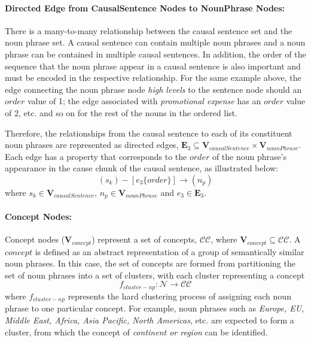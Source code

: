 \paragraph{Directed Edge from CausalSentence Nodes to NounPhrase Nodes:} There is a many-to-many relationship between the causal sentence set and the noun phrase set. A causal sentence can contain multiple noun phrases and a noun phrase can be contained in multiple causal sentences. In addition, the order of the sequence that the noun phrase appear in a causal sentence is also important and must be encoded in the respective relationship. For the same example above, the edge connecting the noun phrase node \emph{high levels} to the sentence node should an $order$ value of 1; the edge associated with \emph{promotional expense} has an $order$ value of 2, etc. and so on for the rest of the nouns in the ordered list. 

Therefore, the relationships from the causal sentence to each of its constituent noun phrases are represented as directed edges, $\mathbf{E}_3 \subseteq \mathbf{V}_{causalSentence} \times \mathbf{V}_{nounPhrase}$. Each edge has a property that corresponds to the $order$ of the noun phrase's appearance in the cause chunk of the causal sentence, as illustrated below:
\[( s_k ) - [ e_3 \{order\} ]\rightarrow ( n_p ) \] 
where $s_k \in \mathbf{V}_{causalSentence}$, $n_p \in \mathbf{V}_{nounPhrase}$ and $e_3 \in \mathbf{E}_3$.


\paragraph{Concept Nodes:} Concept nodes ($\mathbf{V}_{concept}$) represent a set of concepts, $\mathbf{\mathcal{CC}}$, where $\mathbf{V}_{concept} \subseteq \mathcal{CC}$. A $concept$ is defined as an abstract representation of a group of semantically similar noun phrases. In this case, the set of concepts are formed from partitioning the set of noun phrases into a set of clusters, with each cluster representing a concept
\[f_{cluster-np}: \mathbf{\mathcal{N}} \rightarrow \mathbf{\mathcal{CC}}\] 
where $f_{cluster-np}$ represents the hard clustering process of assigning each noun phrase to one particular concept. For example, noun phrases such as \emph{Europe, EU, Middle East, Africa, Asia Pacific, North Americas}, etc. are expected to form a cluster, from which the concept of \emph{continent or region} can be identified.  


